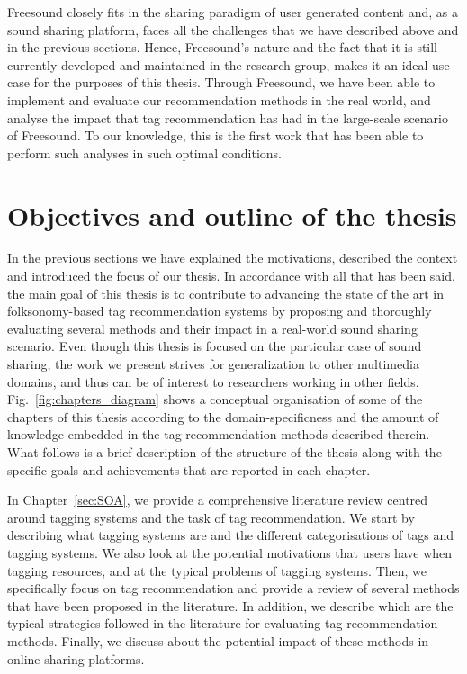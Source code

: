 Freesound closely fits in the sharing paradigm of user generated content and, as a sound sharing platform, faces all the challenges that we have described above and in the previous sections. Hence, Freesound's nature and the fact that it is still currently developed and maintained in the research group, makes it an ideal use case for the purposes of this thesis. Through Freesound, we have been able to implement and evaluate our recommendation methods in the real world, and analyse the impact that tag recommendation has had in the large-scale scenario of Freesound. To our knowledge, this is the first work that has been able to perform such analyses in such optimal conditions.



\section{Objectives and outline of the thesis}

In the previous sections we have explained the motivations, described the context and introduced the focus of our thesis. In accordance with all that has been said, the main goal of this thesis is to contribute to advancing the state of the art in folksonomy-based tag recommendation systems by proposing and thoroughly evaluating several methods and their impact in a real-world sound sharing scenario. Even though this thesis is focused on the particular case of sound sharing, the work we present strives for generalization to other multimedia domains, and thus can be of interest to researchers working in other fields. 
Fig.~\ref{fig:chapters_diagram} shows a conceptual organisation of some of the chapters of this thesis according to the domain-specificness and the amount of knowledge embedded in the tag recommendation methods described therein.
What follows is a brief description of the structure of the thesis along with the specific goals and achievements that are reported in each chapter.

In Chapter~\ref{sec:SOA}, we provide a comprehensive literature review centred around tagging systems and the task of tag recommendation. We start by describing what tagging systems are and the different categorisations of tags and tagging systems. We also look at the potential motivations that users have when tagging resources, and at the typical problems of tagging systems.
Then, we specifically focus on tag recommendation and provide a review of several methods that have been proposed in the literature. 
In addition, we describe which are the typical strategies followed in the literature for evaluating tag recommendation methods. Finally, we discuss about the potential impact of these methods in online sharing platforms. 

